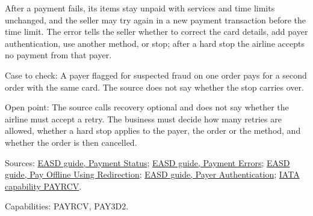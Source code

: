\begin{definition}
  \label{def:payment-failed-payment-recovery}
  \notready
  After a payment fails, its items stay unpaid with services and time limits
  unchanged, and the seller may try again in a new payment transaction
  before the time limit. The error tells the seller whether to correct the
  card details, add payer authentication, use another method, or stop; after
  a hard stop the airline accepts no payment from that payer.

  Case to check: A payer flagged for suspected fraud on one order pays for a
  second order with the same card. The source does not say whether the stop
  carries over.

  Open point: The source calls recovery optional and does not say whether
  the airline must accept a retry. The business must decide how many retries
  are allowed, whether a hard stop applies to the payer, the order or the
  method, and whether the order is then cancelled.

  Sources: \href{https://standards.atlassian.net/wiki/spaces/EASD/pages/574423154/Payment+Status}{EASD guide, Payment Status};
  \href{https://standards.atlassian.net/wiki/spaces/EASD/pages/574587020/Payment+Errors}{EASD guide, Payment Errors};
  \href{https://standards.atlassian.net/wiki/spaces/EASD/pages/574455927/Pay+Offline+Using+Redirection}{EASD guide, Pay Offline Using Redirection};
  \href{https://standards.atlassian.net/wiki/spaces/EASD/pages/574226627/Payer+Authentication}{EASD guide, Payer Authentication};
  \href{https://retailing.iata.org/armi/docs/PAYRCV/}{IATA capability PAYRCV}.

  Capabilities: PAYRCV, PAY3D2.
\end{definition}

